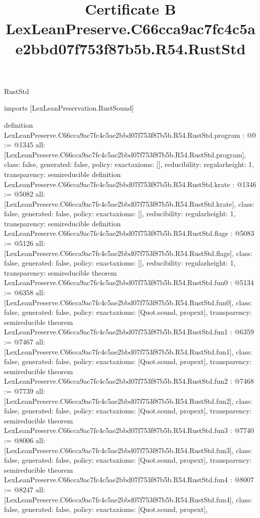 \begin{lexlean}{RustStd}
\title{Certificate B LexLeanPreserve.C66cca9ac7fc4c5ae2bbd07f753f87b5b.R54.RustStd}
\begin{coremodule}
imports [LexLeanPreservation.RustSound]

definition LexLeanPreserve.C66cca9ac7fc4c5ae2bbd07f753f87b5b.R54.RustStd.program : @0 := @1345 {
  all: [LexLeanPreserve.C66cca9ac7fc4c5ae2bbd07f753f87b5b.R54.RustStd.program],
  class: false,
  generated: false,
  policy: exact{axioms: []},
  reducibility: regular{height: 1},
  transparency: semireducible
}
definition LexLeanPreserve.C66cca9ac7fc4c5ae2bbd07f753f87b5b.R54.RustStd.krate : @1346 := @5082 {
  all: [LexLeanPreserve.C66cca9ac7fc4c5ae2bbd07f753f87b5b.R54.RustStd.krate],
  class: false,
  generated: false,
  policy: exact{axioms: []},
  reducibility: regular{height: 1},
  transparency: semireducible
}
definition LexLeanPreserve.C66cca9ac7fc4c5ae2bbd07f753f87b5b.R54.RustStd.flags : @5083 := @5126 {
  all: [LexLeanPreserve.C66cca9ac7fc4c5ae2bbd07f753f87b5b.R54.RustStd.flags],
  class: false,
  generated: false,
  policy: exact{axioms: []},
  reducibility: regular{height: 1},
  transparency: semireducible
}
theorem LexLeanPreserve.C66cca9ac7fc4c5ae2bbd07f753f87b5b.R54.RustStd.fun0 : @5134 := @6358 {
  all: [LexLeanPreserve.C66cca9ac7fc4c5ae2bbd07f753f87b5b.R54.RustStd.fun0],
  class: false,
  generated: false,
  policy: exact{axioms: [Quot.sound, propext]},
  transparency: semireducible
}
theorem LexLeanPreserve.C66cca9ac7fc4c5ae2bbd07f753f87b5b.R54.RustStd.fun1 : @6359 := @7467 {
  all: [LexLeanPreserve.C66cca9ac7fc4c5ae2bbd07f753f87b5b.R54.RustStd.fun1],
  class: false,
  generated: false,
  policy: exact{axioms: [Quot.sound, propext]},
  transparency: semireducible
}
theorem LexLeanPreserve.C66cca9ac7fc4c5ae2bbd07f753f87b5b.R54.RustStd.fun2 : @7468 := @7739 {
  all: [LexLeanPreserve.C66cca9ac7fc4c5ae2bbd07f753f87b5b.R54.RustStd.fun2],
  class: false,
  generated: false,
  policy: exact{axioms: [Quot.sound, propext]},
  transparency: semireducible
}
theorem LexLeanPreserve.C66cca9ac7fc4c5ae2bbd07f753f87b5b.R54.RustStd.fun3 : @7740 := @8006 {
  all: [LexLeanPreserve.C66cca9ac7fc4c5ae2bbd07f753f87b5b.R54.RustStd.fun3],
  class: false,
  generated: false,
  policy: exact{axioms: [Quot.sound, propext]},
  transparency: semireducible
}
theorem LexLeanPreserve.C66cca9ac7fc4c5ae2bbd07f753f87b5b.R54.RustStd.fun4 : @8007 := @8247 {
  all: [LexLeanPreserve.C66cca9ac7fc4c5ae2bbd07f753f87b5b.R54.RustStd.fun4],
  class: false,
  generated: false,
  policy: exact{axioms: [Quot.sound, propext]},
}
\end{coremodule}
\end{lexlean}
